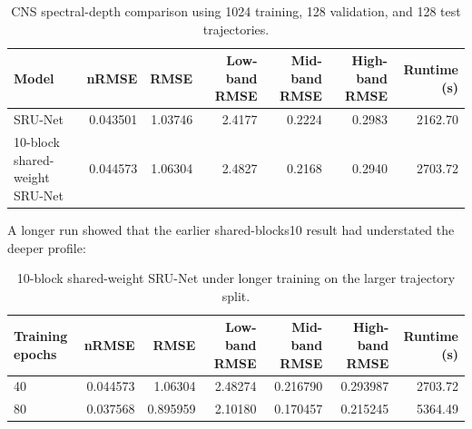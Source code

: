 \documentclass[11pt]{article}
\begin{document}
\begin{table}[h]
\centering
\caption{CNS spectral-depth comparison using 1024 training, 128 validation, and
128 test trajectories.}
\begin{tabular}{lrrrrrr}
\toprule
Model & nRMSE & RMSE & Low-band RMSE & Mid-band RMSE & High-band RMSE & Runtime (s) \\
\midrule
SRU-Net & 0.043501 & 1.03746 & 2.4177 & 0.2224 & 0.2983 & 2162.70 \\
10-block shared-weight SRU-Net & 0.044573 & 1.06304 & 2.4827 & 0.2168 & 0.2940 & 2703.72 \\
\bottomrule
\end{tabular}
\end{table}

A longer run showed that the earlier shared-blocks10 result had understated the
deeper profile:

\begin{table}[h]
\centering
\caption{10-block shared-weight SRU-Net under longer training on the larger
trajectory split.}
\begin{tabular}{lrrrrrr}
\toprule
Training epochs & nRMSE & RMSE & Low-band RMSE & Mid-band RMSE & High-band RMSE & Runtime (s) \\
\midrule
40 & 0.044573 & 1.06304 & 2.48274 & 0.216790 & 0.293987 & 2703.72 \\
80 & 0.037568 & 0.895959 & 2.10180 & 0.170457 & 0.215245 & 5364.49 \\
\bottomrule
\end{tabular}
\end{table}
\end{document}
